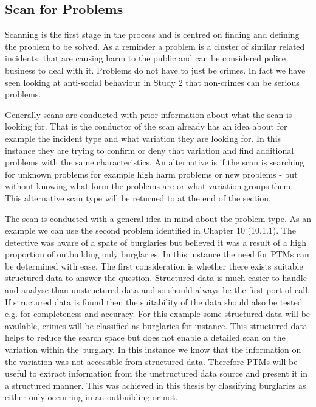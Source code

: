 \subsection{Scan for Problems} Scanning is the first stage in the process and is centred on finding and defining the problem to be solved. As a reminder a problem is a cluster of similar related incidents, that are causing harm to the public and can be considered police business to deal with it. Problems do not have to just be crimes. In fact we have seen looking at anti-social behaviour in Study 2 that non-crimes can be serious problems. 

Generally scans are conducted with prior information about what the scan is looking for. That is the conductor of the scan already has an idea about for example the incident type and what variation they are looking for. In this instance they are trying to confirm or deny that variation and find additional problems with the same characteristics. An alternative is if the scan is searching for unknown problems for example high harm problems or new problems - but without knowing what form the problems are or what variation groups them. This alternative scan type will be returned to at the end of the section.

The scan is conducted with a general idea in mind about the problem type. As an example we can use the second problem identified in Chapter 10 (10.1.1). The detective was aware of a spate of burglaries but believed it was a result of a high proportion of outbuilding only burglaries.  In this instance the need for PTMs can be determined with ease. The first consideration is whether there exists suitable structured data to answer the question. Structured data is much easier to handle and analyse than unstructured data and so should always be the first port of call. If structured data is found then the suitability of the data should also be tested e.g. for completeness and accuracy.  For this example some structured data will be available, crimes will be classified as burglaries for instance. This structured data helps to reduce the search space but does not enable a detailed scan on the variation within the burglary. In this instance we know that the information on the variation was not accessible from structured data. Therefore PTMs will be useful to extract information from the unstructured data source and present it in a structured manner. This was achieved in this thesis by classifying burglaries as either only occurring in an outbuilding or not.  

